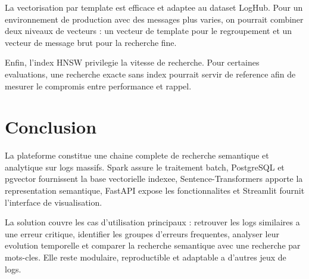 \documentclass[12pt,a4paper]{article}
\begin{document}
La vectorisation par template est efficace et adaptee au dataset LogHub. Pour un environnement de
production avec des messages plus varies, on pourrait combiner deux niveaux de vecteurs : un vecteur
de template pour le regroupement et un vecteur de message brut pour la recherche fine.

Enfin, l'index HNSW privilegie la vitesse de recherche. Pour certaines evaluations, une recherche
exacte sans index pourrait servir de reference afin de mesurer le compromis entre performance et
rappel.

\section{Conclusion}

La plateforme constitue une chaine complete de recherche semantique et analytique sur logs massifs.
Spark
assure le traitement batch, PostgreSQL et pgvector fournissent la base vectorielle indexee,
Sentence-Transformers apporte la representation semantique, FastAPI expose les fonctionnalites et
Streamlit fournit l'interface de visualisation.

La solution couvre les cas d'utilisation principaux : retrouver les logs similaires a une erreur critique,
identifier les groupes d'erreurs frequentes, analyser leur evolution temporelle et comparer la
recherche semantique avec une recherche par mots-cles. Elle reste modulaire, reproductible et
adaptable a d'autres jeux de logs.
\end{document}
